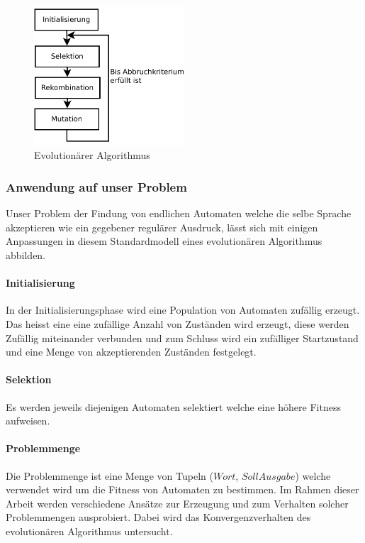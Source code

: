 \begin{figure}[h]
  \centering
  \includegraphics[width=0.5\textwidth]{images/evolutionaerer_algorithmus.pdf}
  \caption[Evolutionärer Algorithmus]{Evolutionärer Algorithmus \cite{droste}}
  \label{fig:evolutionary_algorithm}
\end{figure}

\subsubsection{Anwendung auf unser Problem}
Unser Problem der Findung von endlichen Automaten welche die selbe Sprache akzeptieren wie ein gegebener regulärer Ausdruck, lässt sich mit einigen Anpassungen in diesem Standardmodell eines evolutionären Algorithmus abbilden.

\paragraph{Initialisierung}
In der Initialisierungsphase wird eine Population von Automaten zufällig erzeugt. Das heisst eine eine zufällige Anzahl von Zuständen wird erzeugt, diese werden Zufällig miteinander verbunden und zum Schluss wird ein zufälliger Startzustand und eine Menge von akzeptierenden Zuständen festgelegt.

\paragraph{Selektion}
Es werden jeweils diejenigen Automaten selektiert welche eine höhere Fitness aufweisen.

\paragraph{Problemmenge}
Die Problemmenge ist eine Menge von Tupeln ($Wort$, $Soll Ausgabe$) welche verwendet wird um die Fitness von Automaten zu bestimmen. Im Rahmen dieser Arbeit werden verschiedene Ansätze zur Erzeugung und zum Verhalten solcher Problemmengen ausprobiert. Dabei wird das Konvergenzverhalten des evolutionären Algorithmus untersucht.

